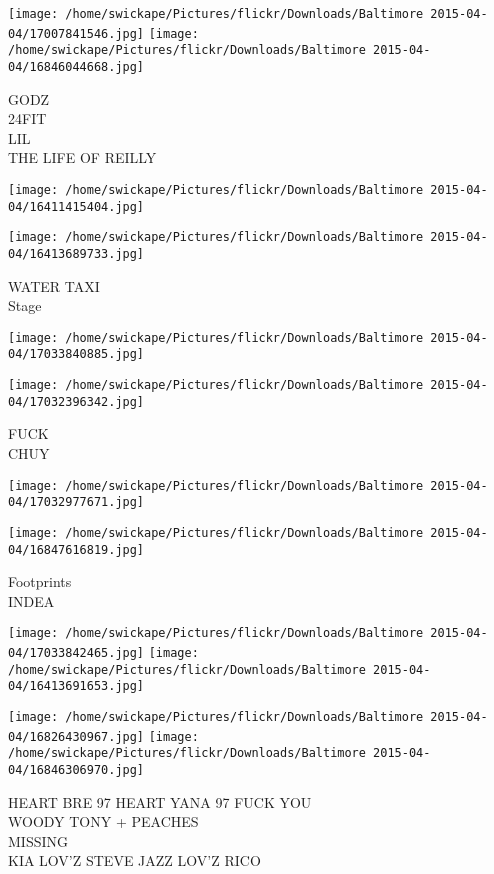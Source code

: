 \documentclass[10pt,letterpaper]{article}
\begin{document}
\texttt{[image: /home/swickape/Pictures/flickr/Downloads/Baltimore 2015-04-04/17007841546.jpg]}
\texttt{[image: /home/swickape/Pictures/flickr/Downloads/Baltimore 2015-04-04/16846044668.jpg]}

GODZ\\
24FIT\\
LIL\\
THE LIFE OF REILLY\\
\pagebreak

\texttt{[image: /home/swickape/Pictures/flickr/Downloads/Baltimore 2015-04-04/16411415404.jpg]}

\vspace{0.25in}
\texttt{[image: /home/swickape/Pictures/flickr/Downloads/Baltimore 2015-04-04/16413689733.jpg]}

WATER TAXI\\
Stage\\
\pagebreak

\texttt{[image: /home/swickape/Pictures/flickr/Downloads/Baltimore 2015-04-04/17033840885.jpg]}

\vspace{0.25in}
\texttt{[image: /home/swickape/Pictures/flickr/Downloads/Baltimore 2015-04-04/17032396342.jpg]}

FUCK\\
CHUY\\
\pagebreak

\texttt{[image: /home/swickape/Pictures/flickr/Downloads/Baltimore 2015-04-04/17032977671.jpg]}

\vspace{0.25in}
\texttt{[image: /home/swickape/Pictures/flickr/Downloads/Baltimore 2015-04-04/16847616819.jpg]}

Footprints\\
INDEA\\
\pagebreak

\texttt{[image: /home/swickape/Pictures/flickr/Downloads/Baltimore 2015-04-04/17033842465.jpg]}
\texttt{[image: /home/swickape/Pictures/flickr/Downloads/Baltimore 2015-04-04/16413691653.jpg]}

\texttt{[image: /home/swickape/Pictures/flickr/Downloads/Baltimore 2015-04-04/16826430967.jpg]}
\texttt{[image: /home/swickape/Pictures/flickr/Downloads/Baltimore 2015-04-04/16846306970.jpg]}

HEART BRE 97 HEART YANA 97 FUCK YOU\\
WOODY TONY + PEACHES\\
MISSING\\
KIA LOV'Z STEVE JAZZ LOV'Z RICO\\
\pagebreak
\end{document}
